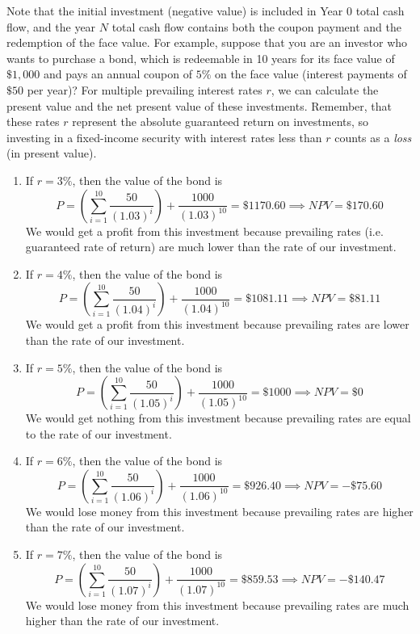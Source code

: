 \documentclass{article}
\begin{document}
    Note that the initial investment (negative value) is included in Year $0$ total cash flow, and the year $N$ total cash flow contains both the coupon payment and the redemption of the face value.
    For example, suppose that you are an investor who wants to purchase a bond, which is redeemable in 10 years for its face value of $\$1,000$ and pays an annual coupon of $5\%$ on the face value (interest payments of $\$50$ per year)? For multiple prevailing interest rates $r$, we can calculate the present value and the net present value of these investments. Remember, that these rates $r$ represent the absolute guaranteed return on investments, so investing in a fixed-income security with interest rates less than $r$ counts as a \textit{loss} (in present value).
    \begin{enumerate}
      \item If $r = 3\%$, then the value of the bond is
      \begin{equation}
        P = \left( \sum_{i=1}^{10} \frac{50}{(1.03)^i} \right) + \frac{1000}{(1.03)^{10}} = \$1170.60 \implies NPV = \$170.60
      \end{equation}
      We would get a profit from this investment because prevailing rates (i.e. guaranteed rate of return) are much lower than the rate of our investment.

      \item If $r = 4\%$, then the value of the bond is
      \begin{equation}
        P = \left( \sum_{i=1}^{10} \frac{50}{(1.04)^i} \right) + \frac{1000}{(1.04)^{10}} = \$1081.11 \implies NPV = \$81.11
      \end{equation}
      We would get a profit from this investment because prevailing rates are lower than the rate of our investment.

      \item If $r = 5\%$, then the value of the bond is
      \begin{equation}
        P = \left( \sum_{i=1}^{10} \frac{50}{(1.05)^i} \right) + \frac{1000}{(1.05)^{10}} = \$1000 \implies NPV = \$0
      \end{equation}
      We would get nothing from this investment because prevailing rates are equal to the rate of our investment.

      \item If $r = 6\%$, then the value of the bond is
      \begin{equation}
        P = \left( \sum_{i=1}^{10} \frac{50}{(1.06)^i} \right) + \frac{1000}{(1.06)^{10}} = \$926.40 \implies NPV = -\$75.60
      \end{equation}
      We would lose money from this investment because prevailing rates are higher than the rate of our investment.

      \item If $r = 7\%$, then the value of the bond is
      \begin{equation}
        P = \left( \sum_{i=1}^{10} \frac{50}{(1.07)^i} \right) + \frac{1000}{(1.07)^{10}} = \$859.53 \implies NPV = -\$140.47
      \end{equation}
      We would lose money from this investment because prevailing rates are much higher than the rate of our investment.
    \end{enumerate}
\end{document}
